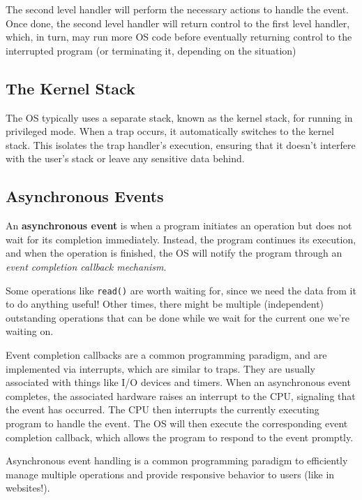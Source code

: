\documentclass{report}
\newcommand{\definitionBegin}[1]{\begin{tcolorbox}[title={Definition: #1}]}
\newcommand{\definitionEnd}{\end{tcolorbox}}
\newcommand{\exampleBegin}[1]{\begin{tcolorbox}[colback=blue!5!white,colframe=black!75!blue,title={Example:
      #1}]}
\newcommand{\exampleEnd}{\end{tcolorbox}}
\begin{document}
The second level handler will perform the necessary actions to handle the event. Once done, the
second level handler will return control to the first level handler, which, in turn, may run more OS
code before eventually returning control to the interrupted program (or terminating it, depending on
the situation)


\subsection*{The Kernel Stack}
\label{subsubsec:TKS}
The OS typically uses a separate stack, known as the kernel stack, for running in privileged
mode. When a trap occurs, it automatically switches to the kernel stack. This isolates the trap
handler's execution, ensuring that it doesn't interfere with the user's stack or leave any sensitive
data behind. 


\subsection{Asynchronous Events}
\definitionBegin{Asynchronous Event}
An \textbf{asynchronous event} is when a program initiates an operation but does not wait for its
completion immediately. Instead, the program continues its execution, and when the operation is
finished, the OS will notify the program through an \textit{event completion callback mechanism}.
\definitionEnd

\exampleBegin{Why Wait?}
Some operations like \texttt{read()} are worth waiting for, since we need the data from it to do
anything useful! Other times, there might be multiple (independent) outstanding operations that can
be done while we wait for the current one we're waiting on.
\exampleEnd

Event completion callbacks are a common programming paradigm, and are implemented via interrupts,
which are similar to traps. They are usually associated with things like I/O devices and
timers. When an asynchronous event completes, the associated hardware raises an interrupt to the
CPU, signaling that the event has occurred. The CPU then interrupts the currently executing program
to handle the event. The OS will then execute the corresponding event completion callback, which
allows the program to respond to the event promptly.

Asynchronous event handling is a common programming paradigm to efficiently manage multiple
operations and provide responsive behavior to users (like in websites!).
\end{document}
